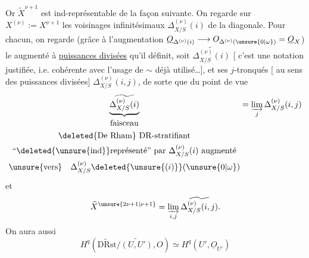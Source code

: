 Or $\widetilde X^{\nu+1}$ est ind-représentable de la façon suivante. On regarde sur $X^{(\nu)}:=X^{\nu+1}$ les voisinages infinitésimaux $\Delta_{X/S}^{(\nu)}(i)$ de la diagonale. Pour chacun, on regarde (grâce à l'augmentation $\underline O_{\Delta^{(\nu)}(i)}\longrightarrow O_{\Delta^{(\nu)}(\unsure{0|\omega})}=\underline O_X$) le  augmenté à \uline{puissances divisées} qu'il définit, soit $\widetilde{\Delta_{X/S}^{(\nu)}(i)}$ [ c'est une notation  justifiée, i.e. cohérente avec  l'usage de $\sim$ déjà utilisé\ldots], et ses $j$-tronqués [   au sens des puissances divisées] $\Delta_{X/S}^{(\nu)}(i,j)$, de sorte que du point de vue
\[
\underbrace{\widetilde{\Delta_{X/S}^{(\nu)}(i)}}_{\begin{gathered}
\text{faisceau}\\
\deleted{\text{De Rham}}\ \mathrm{DR}\text{-stratifiant}\\
\text{``\deleted{\unsure{ind}}représenté'' par }\Delta_{X/S}^{(\nu)}(i)\text{ augmenté}\\
\text{\unsure{vers}}\quad\Delta_{X/S}^{(\nu)}\deleted{\unsure{(i)}}(\unsure{0|\omega})
\end{gathered}}
=\varinjlim_j\Delta_{X/S}^{(\nu)}(i,j)
\]
et
\[
\widetilde X^{\unsure{2\nu+1|\nu+1}}=\varinjlim_{i,j}\widetilde{\Delta_{X/S}^{(\nu)}(i,j)}.
\]
On aura aussi
\[
H^q(\widetilde{\mathrm{DRst}}/\widetilde{(U,U')},O)\simeq H^q(U',\underline O_{U'})
\]
